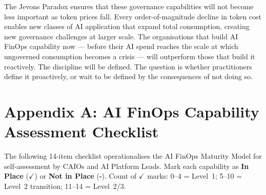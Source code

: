 \documentclass[11pt,twocolumn]{article}
\begin{document}
The Jevons Paradox ensures that these governance capabilities will not become
less important as token prices fall. Every order-of-magnitude decline in token
cost enables new classes of AI application that expand total consumption, creating
new governance challenges at larger scale. The organisations that build AI FinOps
capability now --- before their AI spend reaches the scale at which ungoverned
consumption becomes a crisis --- will outperform those that build it reactively.
The discipline will be defined. The question is whether practitioners define it
proactively, or wait to be defined by the consequences of not doing so.

\balance



\onecolumn
\appendix

\section*{Appendix A: AI FinOps Capability Assessment Checklist}
\label{app:checklist}

The following 14-item checklist operationalises the AI FinOps Maturity Model
for self-assessment by CAIOs and AI Platform Leads. Mark each capability as
\textbf{In Place} ($\checkmark$) or \textbf{Not in Place} ($\square$). Count
of $\checkmark$ marks: 0--4 = Level~1; 5--10 = Level~2 transition; 11--14 = Level~2/3.
\end{document}
